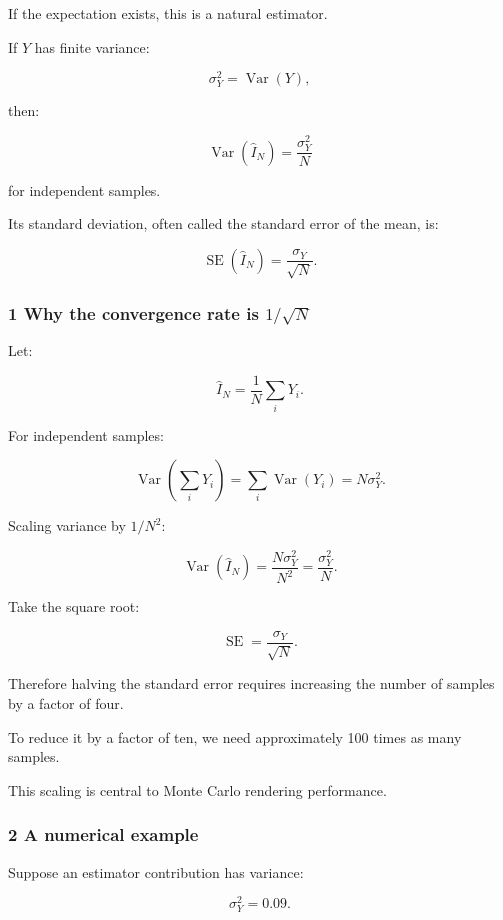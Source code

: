 If the expectation exists, this is a natural estimator.

If \(Y\) has finite variance:

\[
 \sigma_Y^2=\operatorname{Var}(Y),
\]

then:

\[
 \boxed{ \operatorname{Var}(\widehat I_N) = \frac{\sigma_Y^2}{N} }
\]

for independent samples.

Its standard deviation, often called the standard error of the mean, is:

\[
 \boxed{ \operatorname{SE}(\widehat I_N) = \frac{\sigma_Y}{\sqrt N} }.
\]

\subsubsection{\texorpdfstring{1 Why the convergence rate is \(1/\sqrt N\)}{1 Why the convergence rate is 1/\textbackslash sqrt N}}\label{02-foundations-ii-ch030-why-the-convergence-rate-is-1sqrt-n}

Let:

\[
 \widehat I_N= \frac1N\sum_iY_i.
\]

For independent samples:

\[
 \operatorname{Var}\left(\sum_iY_i\right) = \sum_i\operatorname{Var}(Y_i) =N\sigma_Y^2.
\]

Scaling variance by \(1/N^2\):

\[
 \operatorname{Var}(\widehat I_N) = \frac{N\sigma_Y^2}{N^2} = \frac{\sigma_Y^2}{N}.
\]

Take the square root:

\[
 \operatorname{SE}= \frac{\sigma_Y}{\sqrt N}.
\]

Therefore halving the standard error requires increasing the number of samples by a factor of four.

To reduce it by a factor of ten, we need approximately 100 times as many samples.

This scaling is central to Monte Carlo rendering performance.

\subsubsection{2 A numerical example}\label{02-foundations-ii-ch030-a-numerical-example}

Suppose an estimator contribution has variance:

\[
 \sigma_Y^2=0.09.
\]

